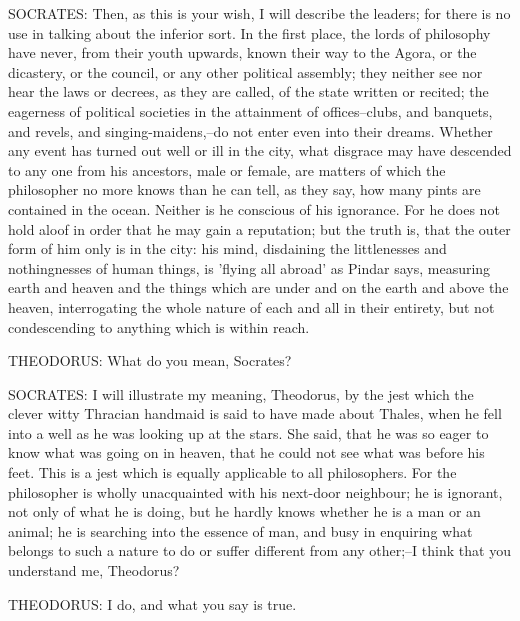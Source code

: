 SOCRATES: Then, as this is your wish, I will describe the leaders; for
there is no use in talking about the inferior sort. In the first place,
the lords of philosophy have never, from their youth upwards, known
their way to the Agora, or the dicastery, or the council, or any other
political assembly; they neither see nor hear the laws or decrees,
as they are called, of the state written or recited; the eagerness of
political societies in the attainment of offices--clubs, and banquets,
and revels, and singing-maidens,--do not enter even into their dreams.
Whether any event has turned out well or ill in the city, what disgrace
may have descended to any one from his ancestors, male or female, are
matters of which the philosopher no more knows than he can tell, as they
say, how many pints are contained in the ocean. Neither is he conscious
of his ignorance. For he does not hold aloof in order that he may gain a
reputation; but the truth is, that the outer form of him only is in the
city: his mind, disdaining the littlenesses and nothingnesses of human
things, is 'flying all abroad' as Pindar says, measuring earth and
heaven and the things which are under and on the earth and above
the heaven, interrogating the whole nature of each and all in their
entirety, but not condescending to anything which is within reach.

THEODORUS: What do you mean, Socrates?

SOCRATES: I will illustrate my meaning, Theodorus, by the jest which the
clever witty Thracian handmaid is said to have made about Thales, when
he fell into a well as he was looking up at the stars. She said, that he
was so eager to know what was going on in heaven, that he could not see
what was before his feet. This is a jest which is equally applicable to
all philosophers. For the philosopher is wholly unacquainted with his
next-door neighbour; he is ignorant, not only of what he is doing, but
he hardly knows whether he is a man or an animal; he is searching into
the essence of man, and busy in enquiring what belongs to such a nature
to do or suffer different from any other;--I think that you understand
me, Theodorus?

THEODORUS: I do, and what you say is true.

